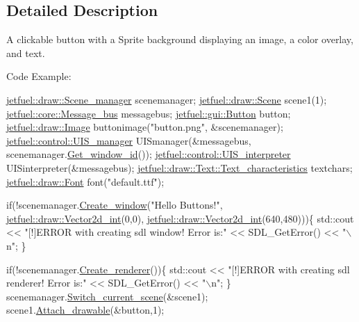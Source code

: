 \subsection{Detailed Description}
A clickable button with a Sprite background displaying an image, a color overlay, and text.

Code Example\+: 
\begin{DoxyCode}
\hyperlink{classjetfuel_1_1draw_1_1Scene__manager}{jetfuel::draw::Scene\_manager} scenemanager;
\hyperlink{classjetfuel_1_1draw_1_1Scene}{jetfuel::draw::Scene} scene1(1);
\hyperlink{classjetfuel_1_1core_1_1Message__bus}{jetfuel::core::Message\_bus} messagebus;
\hyperlink{classjetfuel_1_1gui_1_1Button}{jetfuel::gui::Button} button;
\hyperlink{classjetfuel_1_1draw_1_1Image}{jetfuel::draw::Image} buttonimage(\textcolor{stringliteral}{"button.png"},
                                 &scenemanager);
\hyperlink{classjetfuel_1_1control_1_1UIS__manager}{jetfuel::control::UIS\_manager} UISmanager(&messagebus,
                                  scenemanager.\hyperlink{classjetfuel_1_1draw_1_1Scene__manager_a1758a86d40dcfaface8958fcd33676bf}{Get\_window\_id}());
\hyperlink{classjetfuel_1_1control_1_1UIS__interpreter}{jetfuel::control::UIS\_interpreter} UISinterpreter(&messagebus);
\hyperlink{structjetfuel_1_1draw_1_1Text_1_1Text__characteristics}{jetfuel::draw::Text::Text\_characteristics} textchars;
\hyperlink{classjetfuel_1_1draw_1_1Font}{jetfuel::draw::Font} font(\textcolor{stringliteral}{"default.ttf"});

\textcolor{keywordflow}{if}(!scenemanager.\hyperlink{classjetfuel_1_1draw_1_1Scene__manager_a5113e9062c272a22d383ba872417ba31}{Create\_window}(\textcolor{stringliteral}{"Hello Buttons!"},
                               \hyperlink{classjetfuel_1_1draw_1_1Vector2d}{jetfuel::draw::Vector2d\_int}(0,0),
                          \hyperlink{classjetfuel_1_1draw_1_1Vector2d}{jetfuel::draw::Vector2d\_int}(640,480)))\{
    std::cout << \textcolor{stringliteral}{"[!]ERROR with creating sdl window! Error is:"}
    << SDL\_GetError() << \textcolor{stringliteral}{"\(\backslash\)n"};
\}

\textcolor{keywordflow}{if}(!scenemanager.\hyperlink{classjetfuel_1_1draw_1_1Scene__manager_afafecd926ce5e4b2543a6d583a7d24b6}{Create\_renderer}())\{
    std::cout << \textcolor{stringliteral}{"[!]ERROR with creating sdl renderer! Error is:"}
    << SDL\_GetError() << \textcolor{stringliteral}{"\(\backslash\)n"};
\}
scenemanager.\hyperlink{classjetfuel_1_1draw_1_1Scene__manager_a770c163b88ba8427539ee182315ea989}{Switch\_current\_scene}(&scene1);
scene1.\hyperlink{classjetfuel_1_1draw_1_1Scene_aea4b4c4ae25c30d661be4c52787e0ea3}{Attach\_drawable}(&button,1);


\end{DoxyCode}

